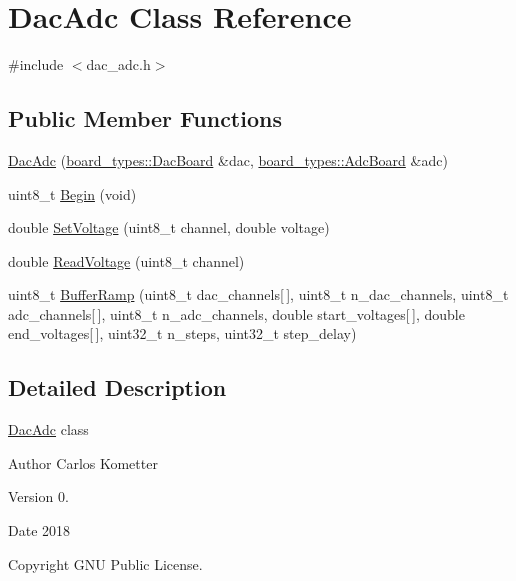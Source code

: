 \hypertarget{classDacAdc}{}\section{Dac\+Adc Class Reference}
\label{classDacAdc}


{\ttfamily \#include $<$dac\+\_\+adc.\+h$>$}

\subsection*{Public Member Functions}
\begin{DoxyCompactItemize}
\item 
\mbox{\hyperlink{classDacAdc_a44566ccabc0c62f8e1236ab3e0d3a7d3}{Dac\+Adc}} (\mbox{\hyperlink{classboard__types_1_1DacBoard}{board\+\_\+types\+::\+Dac\+Board}} \&dac, \mbox{\hyperlink{classboard__types_1_1AdcBoard}{board\+\_\+types\+::\+Adc\+Board}} \&adc)
\item 
uint8\+\_\+t \mbox{\hyperlink{classDacAdc_a47ca1d0dbf523906fe32363599772066}{Begin}} (void)
\item 
double \mbox{\hyperlink{classDacAdc_a767f1e29f9688c1b2292fbfbef8c4622}{Set\+Voltage}} (uint8\+\_\+t channel, double voltage)
\item 
double \mbox{\hyperlink{classDacAdc_a5238dc258e8312e4c28161b2fad77249}{Read\+Voltage}} (uint8\+\_\+t channel)
\item 
uint8\+\_\+t \mbox{\hyperlink{classDacAdc_a4d2b0df392722734dbac322b1d0fa08d}{Buffer\+Ramp}} (uint8\+\_\+t dac\+\_\+channels\mbox{[}$\,$\mbox{]}, uint8\+\_\+t n\+\_\+dac\+\_\+channels, uint8\+\_\+t adc\+\_\+channels\mbox{[}$\,$\mbox{]}, uint8\+\_\+t n\+\_\+adc\+\_\+channels, double start\+\_\+voltages\mbox{[}$\,$\mbox{]}, double end\+\_\+voltages\mbox{[}$\,$\mbox{]}, uint32\+\_\+t n\+\_\+steps, uint32\+\_\+t step\+\_\+delay)
\end{DoxyCompactItemize}


\subsection{Detailed Description}
\mbox{\hyperlink{classDacAdc}{Dac\+Adc}} class \begin{DoxyAuthor}{Author}
Carlos Kometter 
\end{DoxyAuthor}
\begin{DoxyVersion}{Version}
0. 
\end{DoxyVersion}
\begin{DoxyDate}{Date}
2018 
\end{DoxyDate}
\begin{DoxyCopyright}{Copyright}
G\+NU Public License. 
\end{DoxyCopyright}


